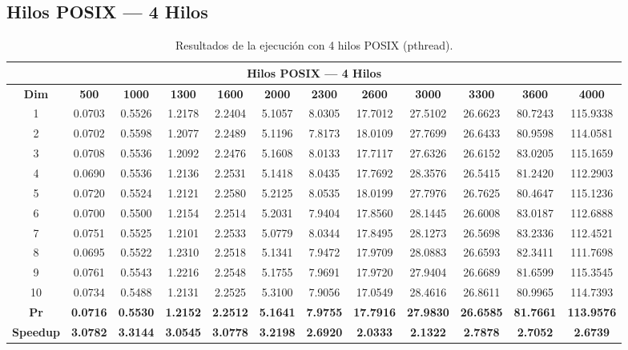 \documentclass{article}
\begin{document}

\subsection{Hilos POSIX --- 4 Hilos}

\begin{table}[H]
\centering
\tiny
\begin{tabular}{|c|c|c|c|c|c|c|c|c|c|c|c|}
\hline
\multicolumn{12}{|c|}{\textbf{Hilos POSIX --- 4 Hilos}} \\
\hline
\textbf{Dim} & \textbf{500} & \textbf{1000} & \textbf{1300} & \textbf{1600} & \textbf{2000} & \textbf{2300} & \textbf{2600} & \textbf{3000} & \textbf{3300} & \textbf{3600} & \textbf{4000} \\
\hline
1  & 0.0703 & 0.5526 & 1.2178 & 2.2404 & 5.1057 & 8.0305 & 17.7012 & 27.5102 & 26.6623 & 80.7243 & 115.9338 \\
2  & 0.0702 & 0.5598 & 1.2077 & 2.2489 & 5.1196 & 7.8173 & 18.0109 & 27.7699 & 26.6433 & 80.9598 & 114.0581 \\
3  & 0.0708 & 0.5536 & 1.2092 & 2.2476 & 5.1608 & 8.0133 & 17.7117 & 27.6326 & 26.6152 & 83.0205 & 115.1659 \\
4  & 0.0690 & 0.5536 & 1.2136 & 2.2531 & 5.1418 & 8.0435 & 17.7692 & 28.3576 & 26.5415 & 81.2420 & 112.2903 \\
5  & 0.0720 & 0.5524 & 1.2121 & 2.2580 & 5.2125 & 8.0535 & 18.0199 & 27.7976 & 26.7625 & 80.4647 & 115.1236 \\
6  & 0.0700 & 0.5500 & 1.2154 & 2.2514 & 5.2031 & 7.9404 & 17.8560 & 28.1445 & 26.6008 & 83.0187 & 112.6888 \\
7  & 0.0751 & 0.5525 & 1.2101 & 2.2533 & 5.0779 & 8.0344 & 17.8495 & 28.1273 & 26.5698 & 83.2336 & 112.4521 \\
8  & 0.0695 & 0.5522 & 1.2310 & 2.2518 & 5.1341 & 7.9472 & 17.9709 & 28.0883 & 26.6593 & 82.3411 & 111.7698 \\
9  & 0.0761 & 0.5543 & 1.2216 & 2.2548 & 5.1755 & 7.9691 & 17.9720 & 27.9404 & 26.6689 & 81.6599 & 115.3545 \\
10 & 0.0734 & 0.5488 & 1.2131 & 2.2525 & 5.3100 & 7.9056 & 17.0549 & 28.4616 & 26.8611 & 80.9965 & 114.7393 \\
\hline
\textbf{Pr} & \textbf{0.0716} & \textbf{0.5530} & \textbf{1.2152} & \textbf{2.2512} & \textbf{5.1641} & \textbf{7.9755} & \textbf{17.7916} & \textbf{27.9830} & \textbf{26.6585} & \textbf{81.7661} & \textbf{113.9576} \\
\hline
\textbf{Speedup} & \textbf{3.0782} & \textbf{3.3144} & \textbf{3.0545} & \textbf{3.0778} & \textbf{3.2198} & \textbf{2.6920} & \textbf{2.0333} & \textbf{2.1322} & \textbf{2.7878} & \textbf{2.7052} & \textbf{2.6739} \\
\hline
\end{tabular}
\caption{Resultados de la ejecución con 4 hilos POSIX (pthread).}
\label{tab:t4}
\end{table}
\end{document}
